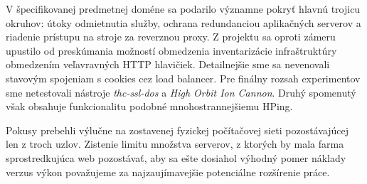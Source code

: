 \documentclass[12pt, a4paper]{article}
\begin{document}
V špecifikovanej predmetnej doméne sa podarilo významne pokryť hlavnú trojicu okruhov: 
útoky odmietnutia služby, ochrana redundanciou aplikačných serverov a riadenie prístupu na stroje 
za reverznou proxy. Z projektu sa oproti zámeru upustilo od preskúmania možností obmedzenia inventarizácie 
infraštruktúry obmedzením veľavravných HTTP hlavičiek. Detailnejšie sme sa nevenovali stavovým spojeniam s 
cookies cez load balancer. Pre finálny rozsah experimentov sme netestovali nástroje \emph{thc-ssl-dos} a 
\emph{High Orbit Ion Cannon}. Druhý spomenutý však obsahuje funkcionalitu podobné mnohostrannejšiemu HPing. 

Pokusy prebehli výlučne na zostavenej fyzickej počítačovej sieti pozostávajúcej len z troch uzlov.
Zistenie limitu množstva serverov, z ktorých by mala farma sprostredkujúca web pozostávať, aby sa ešte
dosiahol výhodný pomer náklady verzus výkon považujeme za najzaujímavejšie potenciálne
rozšírenie práce.
\newpage
{}
\printbibliography[title={Literatúra}]
\end{document}

